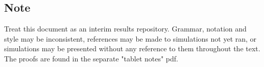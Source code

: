 \subsection{Note}
Treat this document as an interim results repository. Grammar, notation and style may be inconsistent, references may be made to simulations not yet ran, or simulations may be presented without any reference to them throughout the text. The proofs are found in the separate "tablet notes" pdf.